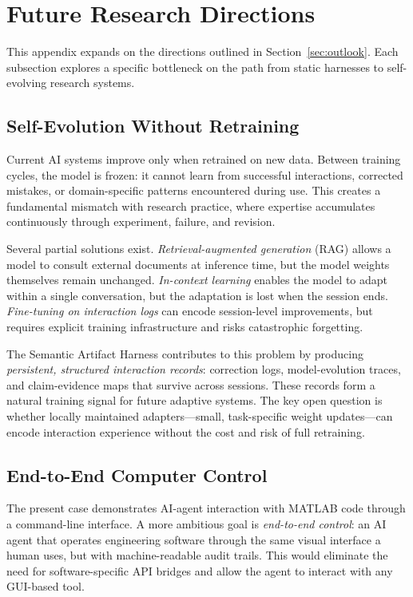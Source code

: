 \documentclass{article}
\begin{document}
\section{Future Research Directions}
\label{sec:app_outlook}

This appendix expands on the directions outlined in Section~\ref{sec:outlook}. Each subsection explores a specific bottleneck on the path from static harnesses to self-evolving research systems.

\subsection{Self-Evolution Without Retraining}

Current AI systems improve only when retrained on new data. Between training cycles, the model is frozen: it cannot learn from successful interactions, corrected mistakes, or domain-specific patterns encountered during use. This creates a fundamental mismatch with research practice, where expertise accumulates continuously through experiment, failure, and revision.

Several partial solutions exist. \emph{Retrieval-augmented generation} (RAG) allows a model to consult external documents at inference time, but the model weights themselves remain unchanged. \emph{In-context learning} enables the model to adapt within a single conversation, but the adaptation is lost when the session ends. \emph{Fine-tuning on interaction logs} can encode session-level improvements, but requires explicit training infrastructure and risks catastrophic forgetting.

The Semantic Artifact Harness contributes to this problem by producing \emph{persistent, structured interaction records}: correction logs, model-evolution traces, and claim-evidence maps that survive across sessions. These records form a natural training signal for future adaptive systems. The key open question is whether locally maintained adapters---small, task-specific weight updates---can encode interaction experience without the cost and risk of full retraining.

\subsection{End-to-End Computer Control}

The present case demonstrates AI-agent interaction with MATLAB code through a command-line interface. A more ambitious goal is \emph{end-to-end control}: an AI agent that operates engineering software through the same visual interface a human uses, but with machine-readable audit trails. This would eliminate the need for software-specific API bridges and allow the agent to interact with any GUI-based tool.
\end{document}
